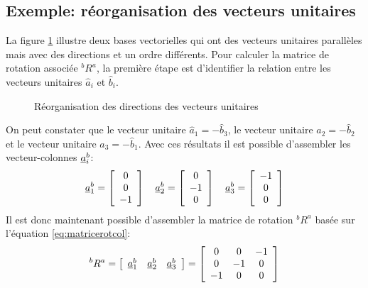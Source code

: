 \subsection{Exemple: réorganisation des vecteurs unitaires}
%
La figure \ref{fig:r_reorg} illustre deux bases vectorielles qui ont des vecteurs unitaires parallèles mais avec des directions et un ordre différents. Pour calculer la matrice de rotation associée $^bR^a$, la première étape est d'identifier la relation entre les vecteurs unitaires $\hat{a}_i$ et $\hat{b}_i$. 
%
\begin{figure}[H]
        \centering
				\hspace{20pt}
				\hspace{20pt}
        \caption{Réorganisation des directions des vecteurs unitaires}
				\label{fig:r_reorg}
\end{figure}
%
On peut constater que le vecteur unitaire $\hat{a}_1=-\hat{b}_3$, le vecteur unitaire $\hat{a}_2=-\hat{b}_2$ et le vecteur unitaire $\hat{a}_3=-\hat{b}_1$. Avec ces résultats il est possible d'assembler les vecteur-colonnes $\underline{a}_i^b$:
\begin{align}
\underline{a}_1^b = \left[ \begin{array}{c} 0 \\ 0 \\ -1  \end{array} \right] \quad
\underline{a}_2^b = \left[ \begin{array}{c} 0 \\ -1 \\ 0 \end{array} \right] \quad
\underline{a}_3^b = \left[ \begin{array}{c} -1 \\ 0 \\ 0   \end{array} \right]
\end{align}
Il est donc maintenant possible d'assembler la matrice de rotation $^bR^a$ basée sur l'équation \eqref{eq:matricerotcol}:
\begin{align}
^bR^a =\left[ \begin{array}{c c c}
	\underline{a}_1^b  & \underline{a}_2^b & \underline{a}_3^b
\end{array}  \right]
= \left[ \begin{array}{c c c}
	0 & 0 & -1 \\
	0 & -1 & 0 \\
-1 & 0 & 0 
\end{array}  \right]
\end{align}




